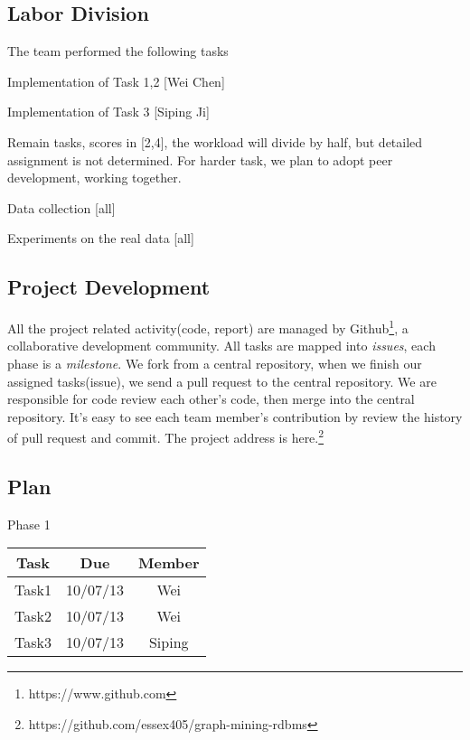 
\subsection{Labor Division}

The team performed the following tasks
\bit
\item Implementation of Task 1,2 [Wei Chen]
\item Implementation of Task 3 [Siping Ji]
\item Remain tasks, scores in [2,4], the workload will divide by half, but detailed assignment is not determined. For harder task, we plan to adopt peer development, working together. 
\item Data collection [all]
\item Experiments on the real data [all]
\eit

\subsection{Project Development}
All the project related activity(code, report) are managed by Github\footnote{https://www.github.com}, a collaborative development community. All tasks are mapped into \emph{issues}, each phase is a \emph{milestone}. We fork from a central repository, when we finish our assigned tasks(issue), we send a pull request to the central repository. We are responsible for code review each other's code, then merge into the central repository. It's easy to see each team member's contribution by review the history of pull request and commit. The project address is here.\footnote{https://github.com/essex405/graph-mining-rdbms}

\subsection{Plan}

\begin{center}
Phase 1\\
\begin{tabular}{|c|c|c|}
\hline
Task & Due & Member \\\hline
Task1 & 10/07/13 & Wei\\\hline
Task2 & 10/07/13 & Wei\\\hline
Task3 & 10/07/13 & Siping\\\hline
\end{tabular}
\end{center}

